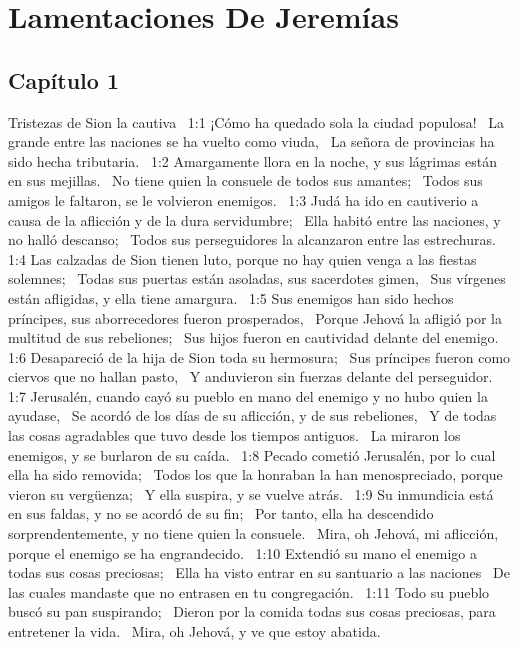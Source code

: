 \chapter{Lamentaciones De Jeremías}

\section*{Capítulo  1}

Tristezas de Sion la cautiva  
1:1 ¡Cómo ha quedado sola la ciudad populosa!  
La grande entre las naciones se ha vuelto como viuda,  
La señora de provincias ha sido hecha tributaria.  
1:2 Amargamente llora en la noche, y sus lágrimas están en sus mejillas.  
No tiene quien la consuele de todos sus amantes;  
Todos sus amigos le faltaron, se le volvieron enemigos.  
1:3 Judá ha ido en cautiverio a causa de la aflicción y de la dura servidumbre;  
Ella habitó entre las naciones, y no halló descanso;  
Todos sus perseguidores la alcanzaron entre las estrechuras.  
1:4 Las calzadas de Sion tienen luto, porque no hay quien venga a las fiestas solemnes;  
Todas sus puertas están asoladas, sus sacerdotes gimen,  
Sus vírgenes están afligidas, y ella tiene amargura.  
1:5 Sus enemigos han sido hechos príncipes, sus aborrecedores fueron prosperados,  
Porque Jehová la afligió por la multitud de sus rebeliones;  
Sus hijos fueron en cautividad delante del enemigo.  
1:6 Desapareció de la hija de Sion toda su hermosura;  
Sus príncipes fueron como ciervos que no hallan pasto,  
Y anduvieron sin fuerzas delante del perseguidor.  
1:7 Jerusalén, cuando cayó su pueblo en mano del enemigo y no hubo quien la ayudase,  
Se acordó de los días de su aflicción, y de sus rebeliones,  
Y de todas las cosas agradables que tuvo desde los tiempos antiguos.  
La miraron los enemigos, y se burlaron de su caída.  
1:8 Pecado cometió Jerusalén, por lo cual ella ha sido removida;  
Todos los que la honraban la han menospreciado, porque vieron su vergüenza;  
Y ella suspira, y se vuelve atrás.  
1:9 Su inmundicia está en sus faldas, y no se acordó de su fin;  
Por tanto, ella ha descendido sorprendentemente, y no tiene quien la consuele.  
Mira, oh Jehová, mi aflicción, porque el enemigo se ha engrandecido.  
1:10 Extendió su mano el enemigo a todas sus cosas preciosas;  
Ella ha visto entrar en su santuario a las naciones  
De las cuales mandaste que no entrasen en tu congregación.  
1:11 Todo su pueblo buscó su pan suspirando;  
Dieron por la comida todas sus cosas preciosas, para entretener la vida.  
Mira, oh Jehová, y ve que estoy abatida.  
